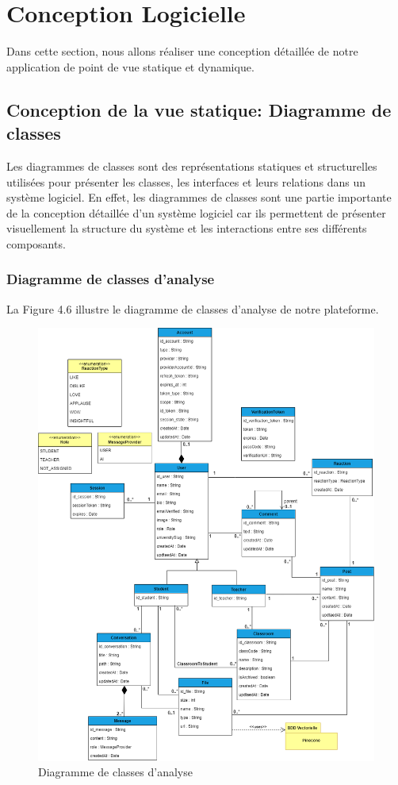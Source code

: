 \section{Conception Logicielle}
Dans cette section, nous allons réaliser une conception détaillée de notre application de point de vue statique et dynamique.

\subsection{Conception de la vue statique: Diagramme de classes}
Les diagrammes de classes sont des représentations statiques et structurelles utilisées pour présenter les classes, les interfaces et leurs relations dans un système logiciel. En effet, les diagrammes de classes sont une partie importante de la conception détaillée d'un système logiciel car ils permettent de présenter visuellement la structure du système et les interactions entre ses différents composants.\\
\subsubsection{Diagramme de classes d'analyse}
La Figure 4.6 illustre le diagramme de classes d’analyse de notre plateforme.
\begin{figure}[H]
    \centering
    \includegraphics[width=1.12\textwidth,height=1.28\textwidth]{images/chp4/fig6.png}
    \caption{Diagramme de classes d'analyse}
    \label{fig:Diagramme de classes d'analyse}    
\end{figure}

